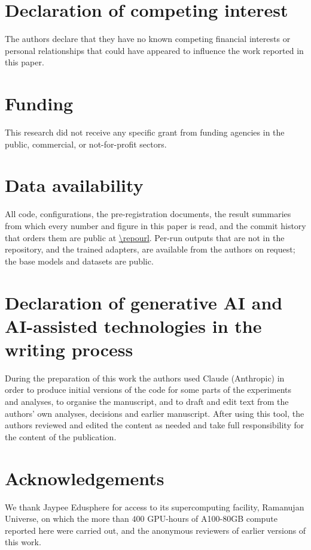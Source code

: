 

\section*{Declaration of competing interest}
The authors declare that they have no known competing financial interests or
personal relationships that could have appeared to influence the work reported
in this paper.

\section*{Funding}
This research did not receive any specific grant from funding agencies in the
public, commercial, or not-for-profit sectors.

\section*{Data availability}
All code, configurations, the pre-registration documents, the result summaries
from which every number and figure in this paper is read, and the commit
history that orders them are public at \url{\repourl}. Per-run outputs that are
not in the repository, and the trained adapters, are available from the
authors on request; the base models and datasets are public.

\section*{Declaration of generative AI and AI-assisted technologies in the
writing process}
During the preparation of this work the authors used Claude (Anthropic) in
order to produce initial versions of the code for some parts of the experiments
and analyses, to organise the manuscript, and to draft and edit text from the
authors' own analyses, decisions and earlier manuscript. After using this tool, the authors reviewed
and edited the content as needed and take full responsibility for the content
of the publication.

\section*{Acknowledgements}
We thank Jaypee Edusphere for access to its supercomputing facility, Ramanujan
Universe, on which the more than $400$ GPU-hours of A100-80GB compute reported
here were carried out, and the anonymous reviewers of earlier versions of this
work.
